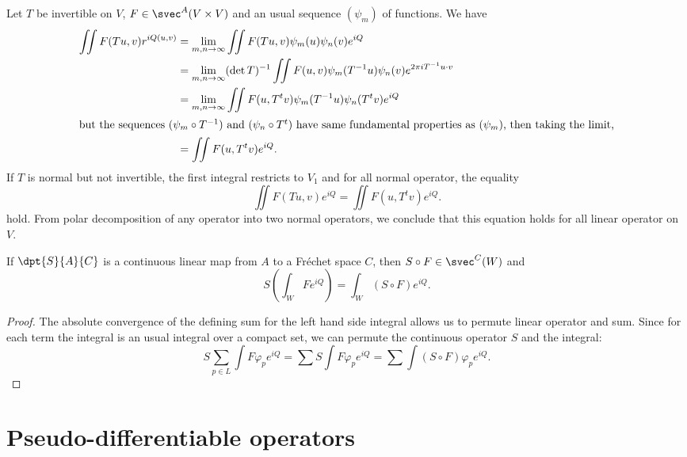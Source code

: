 Let $T$ be invertible on $V$, $F\in\svec^A(V\times V)$ and an usual sequence $(\psi_m)$ of functions. We have
\begin{equation}
\begin{split}
  \iint F(Tu,v)r^{iQ(u,v)}&=\lim_{m,n\to\infty}\iint F(Tu,v)\psi_m(u)\psi_n(v)e^{iQ}\\
                          &=\lim_{m,n\to\infty}(\det T)^{-1}\iint F(u,v)\psi_m(T^{-1}u)\psi_n(v)e^{2\pi i T^{-1} u\cdot v}\\
                          &=\lim_{m,n\to\infty}\iint F(u,T^tv)\psi_m(T^{-1}u)\psi_n(T^tv)e^{iQ}\\
\intertext{but the sequences $(\psi_m\circ T^{-1})$ and $(\psi_n\circ T^t)$ have same fundamental properties as $(\psi_m)$, then taking the limit,}
&=\iint F(u,T^tv)e^{iQ}.
\end{split}
\end{equation}
If $T$ is normal but not invertible, the first integral restricts to $V_1$ and for all normal operator, the equality
\[ 
  \iint F(Tu,v)e^{iQ}=\iint F(u,T^tv)e^{iQ}.
\]
hold. From polar decomposition of any operator into two normal operators, we conclude that this equation holds for all linear operator on $V$.

\begin{proposition}
If $\dpt{S}{A}{C}$ is a continuous linear map from $A$ to a Fréchet space $C$, then $S\circ F\in\svec^C(W)$ and
\begin{equation}
 S( \int_WFe^{iQ} )=\int_W(S\circ F)e^{iQ}.
\end{equation}

\end{proposition}

\begin{proof}
The absolute convergence of the defining sum for the left hand side integral allows us to permute linear operator and sum. Since for each term the integral is an usual integral over a compact set, we can permute the continuous operator $S$ and the integral:
\begin{equation}
  S\sum_{p\in L}\int F\varphi_pe^{iQ}=\sum S\int F\varphi_pe^{iQ}=\sum\int (S\circ F)\varphi_pe^{iQ}.
\end{equation}


\end{proof}




%
   \section{Pseudo-differentiable operators}
%


